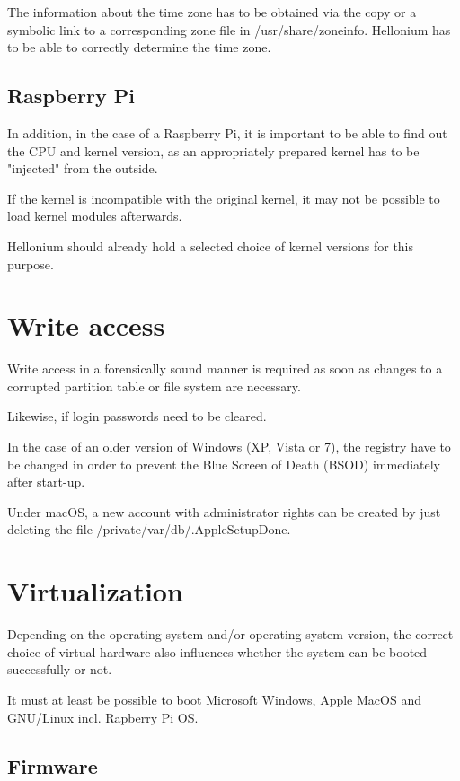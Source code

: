 The information about the time zone has to be obtained via the copy or a symbolic link to a corresponding zone file in /usr/share/zoneinfo. Hellonium has to be able to correctly determine the time zone.

\subsection{Raspberry Pi}

In addition, in the case of a Raspberry Pi, it is important to be able to find out the CPU and kernel version, as an appropriately prepared kernel has to be "injected" from the outside. 

If the kernel is incompatible with the original kernel, it may not be possible to load kernel modules afterwards.

Hellonium should already hold a selected choice of kernel versions for this purpose.

\section{Write access}
\label{sec:writeaccess}

Write access in a forensically sound manner is required as soon as changes to a corrupted partition table or file system are necessary.

Likewise, if login passwords need to be cleared.

In the case of an older version of Windows (XP, Vista or 7), the registry have to be changed in order to prevent the Blue Screen of Death (BSOD) immediately after start-up.

Under macOS, a new account with administrator rights can be created by just deleting the file /private/var/db/.AppleSetupDone.

\section{Virtualization}
\label{sec:virtualization}

Depending on the operating system and/or operating system version, the correct choice of virtual hardware also influences whether the system can be booted successfully or not.

It must at least be possible to boot Microsoft Windows, Apple MacOS and GNU/Linux incl. Rapberry Pi OS.

\subsection{Firmware}

